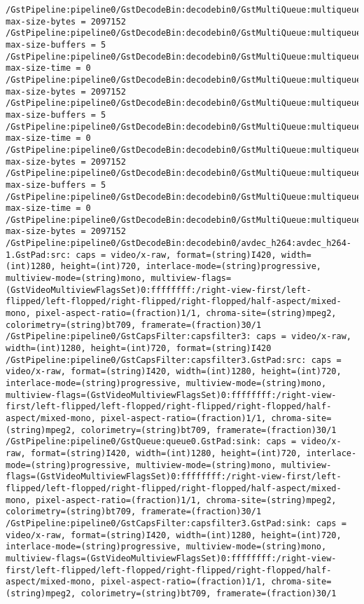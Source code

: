 \documentclass[12pt,oneside]{book}
\begin{document}
\begin{lstlisting}
/GstPipeline:pipeline0/GstDecodeBin:decodebin0/GstMultiQueue:multiqueue0: max-size-bytes = 2097152
/GstPipeline:pipeline0/GstDecodeBin:decodebin0/GstMultiQueue:multiqueue0: max-size-buffers = 5
/GstPipeline:pipeline0/GstDecodeBin:decodebin0/GstMultiQueue:multiqueue0: max-size-time = 0
/GstPipeline:pipeline0/GstDecodeBin:decodebin0/GstMultiQueue:multiqueue0: max-size-bytes = 2097152
/GstPipeline:pipeline0/GstDecodeBin:decodebin0/GstMultiQueue:multiqueue0: max-size-buffers = 5
/GstPipeline:pipeline0/GstDecodeBin:decodebin0/GstMultiQueue:multiqueue0: max-size-time = 0
/GstPipeline:pipeline0/GstDecodeBin:decodebin0/GstMultiQueue:multiqueue0: max-size-bytes = 2097152
/GstPipeline:pipeline0/GstDecodeBin:decodebin0/GstMultiQueue:multiqueue0: max-size-buffers = 5
/GstPipeline:pipeline0/GstDecodeBin:decodebin0/GstMultiQueue:multiqueue0: max-size-time = 0
/GstPipeline:pipeline0/GstDecodeBin:decodebin0/GstMultiQueue:multiqueue0: max-size-bytes = 2097152
/GstPipeline:pipeline0/GstDecodeBin:decodebin0/avdec_h264:avdec_h264-1.GstPad:src: caps = video/x-raw, format=(string)I420, width=(int)1280, height=(int)720, interlace-mode=(string)progressive, multiview-mode=(string)mono, multiview-flags=(GstVideoMultiviewFlagsSet)0:ffffffff:/right-view-first/left-flipped/left-flopped/right-flipped/right-flopped/half-aspect/mixed-mono, pixel-aspect-ratio=(fraction)1/1, chroma-site=(string)mpeg2, colorimetry=(string)bt709, framerate=(fraction)30/1
/GstPipeline:pipeline0/GstCapsFilter:capsfilter3: caps = video/x-raw, width=(int)1280, height=(int)720, format=(string)I420
/GstPipeline:pipeline0/GstCapsFilter:capsfilter3.GstPad:src: caps = video/x-raw, format=(string)I420, width=(int)1280, height=(int)720, interlace-mode=(string)progressive, multiview-mode=(string)mono, multiview-flags=(GstVideoMultiviewFlagsSet)0:ffffffff:/right-view-first/left-flipped/left-flopped/right-flipped/right-flopped/half-aspect/mixed-mono, pixel-aspect-ratio=(fraction)1/1, chroma-site=(string)mpeg2, colorimetry=(string)bt709, framerate=(fraction)30/1
/GstPipeline:pipeline0/GstQueue:queue0.GstPad:sink: caps = video/x-raw, format=(string)I420, width=(int)1280, height=(int)720, interlace-mode=(string)progressive, multiview-mode=(string)mono, multiview-flags=(GstVideoMultiviewFlagsSet)0:ffffffff:/right-view-first/left-flipped/left-flopped/right-flipped/right-flopped/half-aspect/mixed-mono, pixel-aspect-ratio=(fraction)1/1, chroma-site=(string)mpeg2, colorimetry=(string)bt709, framerate=(fraction)30/1
/GstPipeline:pipeline0/GstCapsFilter:capsfilter3.GstPad:sink: caps = video/x-raw, format=(string)I420, width=(int)1280, height=(int)720, interlace-mode=(string)progressive, multiview-mode=(string)mono, multiview-flags=(GstVideoMultiviewFlagsSet)0:ffffffff:/right-view-first/left-flipped/left-flopped/right-flipped/right-flopped/half-aspect/mixed-mono, pixel-aspect-ratio=(fraction)1/1, chroma-site=(string)mpeg2, colorimetry=(string)bt709, framerate=(fraction)30/1

\end{lstlisting}
\end{document}

